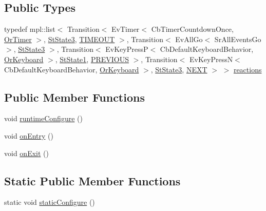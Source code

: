 \subsection*{Public Types}
\begin{DoxyCompactItemize}
\item 
typedef mpl\+::list$<$ Transition$<$ Ev\+Timer$<$ Cb\+Timer\+Countdown\+Once, \hyperlink{classsm__ferrari_1_1OrTimer}{Or\+Timer} $>$, \hyperlink{structsm__ferrari_1_1StState3}{St\+State3}, \hyperlink{structsm__ferrari_1_1StState2_1_1TIMEOUT}{T\+I\+M\+E\+O\+UT} $>$, Transition$<$ Ev\+All\+Go$<$ Sr\+All\+Events\+Go $>$, \hyperlink{structsm__ferrari_1_1StState3}{St\+State3} $>$, Transition$<$ Ev\+Key\+PressP$<$ Cb\+Default\+Keyboard\+Behavior, \hyperlink{classsm__ferrari_1_1OrKeyboard}{Or\+Keyboard} $>$, \hyperlink{structsm__ferrari_1_1StState1}{St\+State1}, \hyperlink{structsm__ferrari_1_1StState2_1_1PREVIOUS}{P\+R\+E\+V\+I\+O\+US} $>$, Transition$<$ Ev\+Key\+PressN$<$ Cb\+Default\+Keyboard\+Behavior, \hyperlink{classsm__ferrari_1_1OrKeyboard}{Or\+Keyboard} $>$, \hyperlink{structsm__ferrari_1_1StState3}{St\+State3}, \hyperlink{structsm__ferrari_1_1StState2_1_1NEXT}{N\+E\+XT} $>$ $>$ \hyperlink{structsm__ferrari_1_1StState2_a22ae0b8d881cce5fe45b33e73ed73c3f}{reactions}
\end{DoxyCompactItemize}
\subsection*{Public Member Functions}
\begin{DoxyCompactItemize}
\item 
void \hyperlink{structsm__ferrari_1_1StState2_a9bcdeff671e5e19eb07a32bedca1f161}{runtime\+Configure} ()
\item 
void \hyperlink{structsm__ferrari_1_1StState2_ad2bd9cb574de21ba35dcd81868a2cf8a}{on\+Entry} ()
\item 
void \hyperlink{structsm__ferrari_1_1StState2_a4b8c24281cf71ebfc54d280886de30ca}{on\+Exit} ()
\end{DoxyCompactItemize}
\subsection*{Static Public Member Functions}
\begin{DoxyCompactItemize}
\item 
static void \hyperlink{structsm__ferrari_1_1StState2_a7767abca55071ed12ae3334b0a720c7c}{static\+Configure} ()
\end{DoxyCompactItemize}
